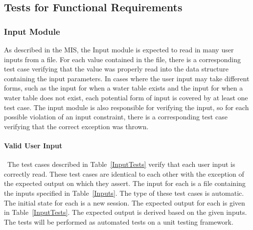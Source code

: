 \documentclass[12pt, titlepage]{article}
\begin{document}
\subsection{Tests for Functional Requirements}

\subsubsection{Input Module}

As described in the MIS, the Input module is expected to read in many user 
inputs from a file. For each value contained in the file, there is a 
corresponding test case verifying that the value was properly read into the 
data structure containing the input parameters. In cases where the user input 
may take different forms, such as the input for when a water table exists and 
the input for when a water table does not exist, each potential form of input 
is covered by at least one test case. The input module is also responsible for 
verifying the input, so for each possible violation of an input constraint, 
there is a corresponding test case verifying that the correct exception was 
thrown.

\paragraph{Valid User Input}

~\newline \noindent The test cases described in Table~\ref{InputTests} 
verify that each user input is correctly read. These test cases are identical 
to each other with the exception of the expected output on which they assert. 
The input for each is a file containing the inputs specified in 
Table~\ref{Inputs}. The type of these test cases is automatic. The initial 
state for each is a new session. The expected output for each is given in 
Table~\ref{InputTests}. The expected output is derived based on the given 
inputs. The tests will be performed as automated tests on a unit testing 
framework.
\end{document}
